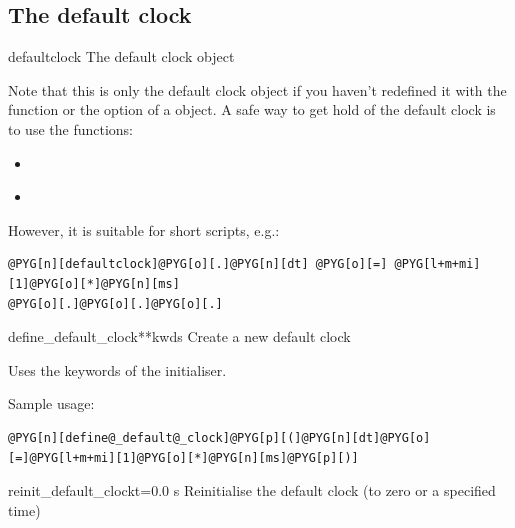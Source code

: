\documentclass[letterpaper,10pt,english]{manual}
\begin{document}
\subsection{The default clock}

\hypertarget{brian.defaultclock}{}\begin{datadesc}{defaultclock}
The default clock object

Note that this is only the default clock object if you haven't
redefined it with the \hyperlink{brian.define_default_clock}{} function or the
 option of a \hyperlink{brian.Clock}{} object. A safe way to
get hold of the default clock is to use the functions:
\begin{itemize}
\item {} 
\hyperlink{brian.get_default_clock}{}

\item {} 
\hyperlink{brian.reinit_default_clock}{}

\end{itemize}

However, it is suitable for short scripts, e.g.:

\begin{Verbatim}[commandchars=@\[\]]
@PYG[n][defaultclock]@PYG[o][.]@PYG[n][dt] @PYG[o][=] @PYG[l+m+mi][1]@PYG[o][*]@PYG[n][ms]
@PYG[o][.]@PYG[o][.]@PYG[o][.]
\end{Verbatim}
\end{datadesc}

\hypertarget{brian.define_default_clock}{}\begin{funcdesc}{define\_default\_clock}{**kwds}
Create a new default clock

Uses the keywords of the \hyperlink{brian.Clock}{} initialiser.

Sample usage:

\begin{Verbatim}[commandchars=@\[\]]
@PYG[n][define@_default@_clock]@PYG[p][(]@PYG[n][dt]@PYG[o][=]@PYG[l+m+mi][1]@PYG[o][*]@PYG[n][ms]@PYG[p][)]
\end{Verbatim}
\end{funcdesc}

\hypertarget{brian.reinit_default_clock}{}\begin{funcdesc}{reinit\_default\_clock}{t=0.0 s}
Reinitialise the default clock (to zero or a specified time)
\end{funcdesc}
\end{document}
